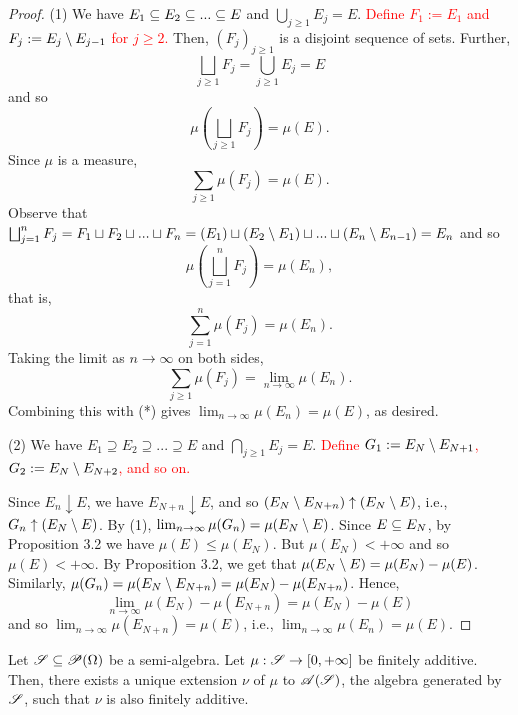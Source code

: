 \begin{proof}
  (1) We have $E_1 \subseteq E_2 \subseteq ... \subseteq E$ and $\bigcup_{j \geq 1} E_j = E$. \textcolor{red}{Define $F_1 := E_1$ and $F_j := E_j \setminus E_{j - 1}$ for $j \geq 2$.} Then, $(F_j)_{j \geq 1}$ is a disjoint sequence of sets. Further, 
  \[
  \bigsqcup_{j \geq 1} F_j = \bigcup_{j \geq 1} E_j = E
  \]
  and so
  \[
  \mu \left( \bigsqcup_{j \geq 1} F_j\right) = \mu(E).
  \]
  Since $\mu$ is a measure, 
  \[
  \sum_{j \geq 1} \mu(F_j) = \mu(E). \tag{*}
  \]
  Observe that $\bigsqcup_{j = 1}^n F_j = F_1 \sqcup F_2 \sqcup ... \sqcup F_n = (E_1) \sqcup (E_2 \setminus E_1) \sqcup ... \sqcup (E_n \setminus E_{n - 1})= E_n$ and so
  \[
  \mu \left(\bigsqcup_{j = 1}^n F_j \right) = \mu(E_n),
  \]
  that is, 
  \[
  \sum_{j = 1}^n \mu(F_j) = \mu(E_n).
  \]
  Taking the limit as $n \to \infty$ on both sides, 
  \[
  \sum_{j \geq 1} \mu(F_j) = \lim_{n \to \infty} \mu(E_n).
  \]
  Combining this with (*) gives $\lim_{n \to \infty} \mu(E_n) = \mu(E)$, as desired. 

  (2) We have $E_1 \supseteq E_2 \supseteq ... \supseteq E$ and $\bigcap_{j \geq 1} E_j = E$. \textcolor{red}{Define $G_1 := E_{N} \setminus E_{N + 1}$, $G_2 := E_{N} \setminus E_{N + 2}$, and so on.} 
  
  Since $E_n \downarrow E$, we have $E_{N + n} \downarrow E$, and so $(E_N \setminus E_{N + n}) \uparrow (E_N \setminus E)$, i.e., $G_n \uparrow (E_N \setminus E)$. By (1), $\lim_{n \to \infty} \mu(G_n) = \mu(E_N \setminus E)$. Since $E \subseteq E_N$, by Proposition 3.2 we have $\mu(E) \leq \mu(E_N)$. But $\mu(E_N) < +\infty$ and so $\mu(E) < + \infty$. By Proposition 3.2, we get that $\mu(E_N \setminus E) = \mu(E_N) - \mu(E)$. Similarly, $\mu(G_n) = \mu(E_N \setminus E_{N + n}) = \mu(E_N) - \mu(E_{N + n})$. Hence, 
  \[ \lim_{n \to \infty} \mu(E_N) - \mu(E_{N + n}) = \mu(E_N) - \mu(E) \]
  and so $\lim_{n \to \infty} \mu(E_{N + n}) = \mu(E)$, i.e., $\lim_{n \to \infty} \mu(E_n) = \mu(E)$. 
\end{proof}

\begin{theorem}
  Let $\mathscr{S} \subseteq \mathscr{P}(\Omega)$ be a semi-algebra. Let $\mu : \mathscr{S} \to [0, + \infty]$ be finitely additive. Then, there exists a unique extension $\nu$ of $\mu$ to $\mathscr{A}(\mathscr{S})$, the algebra generated by $\mathscr{S}$, such that $\nu$ is also finitely additive. 
\end{theorem}

